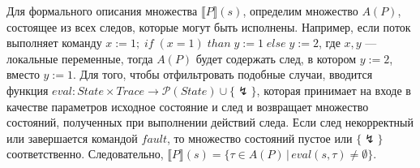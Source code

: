 Для формального описания множества $\llbracket P \rrbracket (s)$, определим множество $A(P)$, состоящее из всех следов, которые могут быть исполнены. Например, если поток выполняет команду $x := 1;\; if \; (x = 1) \; than \; y := 1 \; else \; y := 2$, где $x, y$ --- локальные переменные, тогда $A(P)$ будет содержать след, в котором $y := 2$, вместо $y := 1$. Для того, чтобы отфильтровать подобные случаи, вводится функция $eval: State \times Trace \to \mathcal{P}(State) \cup \{\lightning\}$, которая принимает на входе в качестве параметров исходное состояние и след и возвращает множество состояний, полученных при выполнении действий следа. Если след некорректный или завершается командой $fault$, то множество состояний пустое или $\{\lightning\}$ соответственно. Следовательно, $\llbracket P \rrbracket (s) = \{\tau \in A(P) \, | \, eval(s,\tau) \neq \emptyset \}$.
